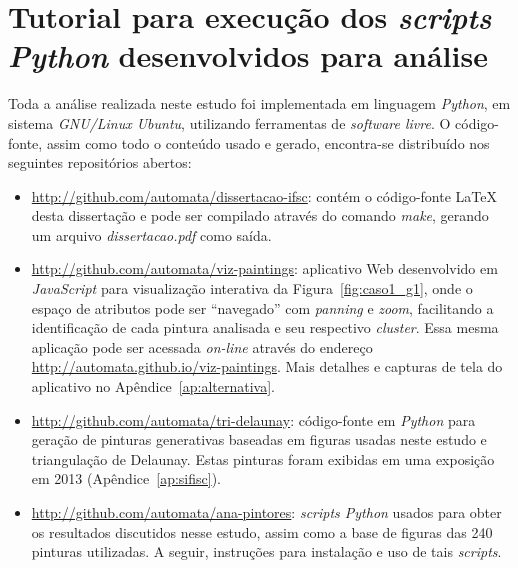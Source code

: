 \chapter{Tutorial para execução dos \textit{scripts Python} desenvolvidos para análise}
\label{cap:ap-tutorial}

Toda a análise realizada neste estudo foi implementada em linguagem
\textit{Python}, em sistema \textit{GNU/Linux Ubuntu}, utilizando
ferramentas de \textit{software livre}. O código-fonte, assim como
todo o conteúdo usado e gerado, encontra-se distribuído nos seguintes
repositórios abertos:

\begin{itemize}
  \item{\url{http://github.com/automata/dissertacao-ifsc}: contém o
    código-fonte \LaTeX \, desta dissertação e pode ser compilado através
    do comando \textit{make}, gerando um arquivo
    \textit{dissertacao.pdf} como saída.}
  \item{\url{http://github.com/automata/viz-paintings}: aplicativo Web
    desenvolvido em \textit{JavaScript} para visualização interativa
    da Figura~\ref{fig:caso1_g1}, onde o espaço de atributos pode ser
    ``navegado'' com \textit{panning} e \textit{zoom}, facilitando a
    identificação de cada pintura analisada e seu respectivo
    \textit{cluster}. Essa mesma aplicação pode ser acessada
    \textit{on-line} através do endereço
    \url{http://automata.github.io/viz-paintings}. Mais detalhes e
    capturas de tela do aplicativo no Apêndice~\ref{ap:alternativa}.}
  \item{\url{http://github.com/automata/tri-delaunay}: código-fonte em
    \textit{Python} para geração de pinturas generativas baseadas em
    figuras usadas neste estudo e triangulação de Delaunay. Estas
    pinturas foram exibidas em uma exposição em 2013
    (Apêndice~\ref{ap:sifisc}).}
  \item{\url{http://github.com/automata/ana-pintores}: \textit{scripts
      Python} usados para obter os resultados discutidos nesse estudo,
    assim como a base de figuras das 240 pinturas utilizadas. A
    seguir, instruções para instalação e uso de tais
    \textit{scripts}.}
\end{itemize}

